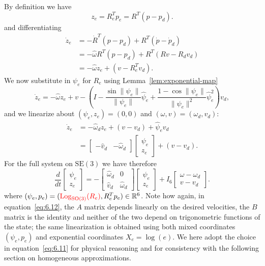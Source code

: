\documentclass[11pt]{article}
\newcommand{\rev}[1]{\textcolor{red}{#1}}
\newcommand{\Log}{\operatorname{Log}}
\newcommand{\SO}{\mathrm{SO}}
\newcommand{\SE}{\mathrm{SE}}
\newcommand{\R}{\mathbb R}
\begin{document}
By definition we have
\begin{equation*}
z_e=R_e^Tp_e=R^T(p-p_d).\tag{6.11}\label{eq:6.11}
\end{equation*}
and differentiating
\begin{align*}
\dot z_e&=-\dot R^T(p-p_d)+R^T(\dot p-\dot p_d)\\
&=-\widehat\omega R^T(p-p_d)+R^T(Rv-R_dv_d)\\
&=-\widehat\omega z_e+(v-R_e^Tv_d).
\end{align*}
We now substitute in $\psi_e$ for $R_e$ using Lemma~\ref{lem:exponential-map}
\begin{equation*}
\dot z_e=-\widehat\omega z_e+v-\left(I-\frac{\sin\|\psi_e\|}{\|\psi_e\|}\widehat\psi_e+\frac{1-\cos\|\psi_e\|}{\|\psi_e\|^2}\widehat\psi_e^2\right)v_d,
\end{equation*}
and we linearize about $(\psi_e,z_e)=(0,0)$ and $(\omega,v)=(\omega_d,v_d)$:
\begin{align*}
\dot z_e&=-\widehat\omega_d z_e+(v-v_d)+\widehat\psi_ev_d\\
&=\begin{bmatrix}-\widehat v_d&-\widehat\omega_d\end{bmatrix}\begin{bmatrix}\psi_e\\z_e\end{bmatrix}+(v-v_d).
\end{align*}
For the full system on $\SE(3)$ we have therefore
\begin{equation*}
\frac{d}{dt}\begin{bmatrix}\psi_e\\z_e\end{bmatrix}
=-\begin{bmatrix}\widehat\omega_d&0\\\widehat v_d&\widehat\omega_d\end{bmatrix}
\begin{bmatrix}\psi_e\\z_e\end{bmatrix}
+I_6\begin{bmatrix}\omega-\omega_d\\v-v_d\end{bmatrix}.\tag{6.12}\label{eq:6.12}
\end{equation*}
where $(\psi_e,p_e)=(\rev{\Log_{\SO(3)}(R_e)},R_e^Tp_e)\in\R^6$. Note how again, in equation~\eqref{eq:6.12}, the $A$ matrix depends linearly on the desired velocities, the $B$ matrix is the identity and neither of the two depend on trigonometric functions of the state; the same linearization is obtained using both mixed coordinates $(\psi_e,p_e)$ and exponential coordinates $X_e=\log(e)$. We here adopt the choice in equation~\eqref{eq:6.11} for physical reasoning and for consistency with the following section on homogeneous approximations.
\end{document}
